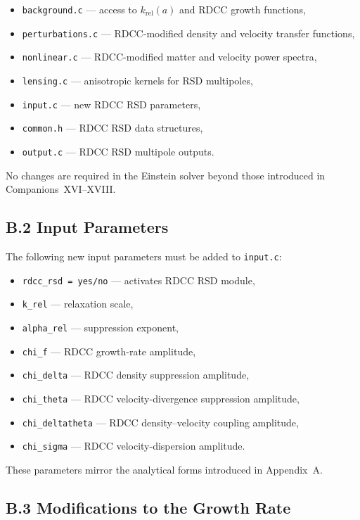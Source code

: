 \documentclass[11pt,a4paper]{article}
\begin{document}
\begin{itemize}
\item \texttt{background.c} — access to $k_{\mathrm{rel}}(a)$ and RDCC growth functions,
\item \texttt{perturbations.c} — RDCC-modified density and velocity transfer functions,
\item \texttt{nonlinear.c} — RDCC-modified matter and velocity power spectra,
\item \texttt{lensing.c} — anisotropic kernels for RSD multipoles,
\item \texttt{input.c} — new RDCC RSD parameters,
\item \texttt{common.h} — RDCC RSD data structures,
\item \texttt{output.c} — RDCC RSD multipole outputs.
\end{itemize}

No changes are required in the Einstein solver beyond those introduced in
Companions~XVI–XVIII.

\subsection*{B.2 Input Parameters}

The following new input parameters must be added to \texttt{input.c}:

\begin{itemize}
\item \texttt{rdcc\_rsd = yes/no} — activates RDCC RSD module,
\item \texttt{k\_rel} — relaxation scale,
\item \texttt{alpha\_rel} — suppression exponent,
\item \texttt{chi\_f} — RDCC growth-rate amplitude,
\item \texttt{chi\_delta} — RDCC density suppression amplitude,
\item \texttt{chi\_theta} — RDCC velocity-divergence suppression amplitude,
\item \texttt{chi\_deltatheta} — RDCC density–velocity coupling amplitude,
\item \texttt{chi\_sigma} — RDCC velocity-dispersion amplitude.
\end{itemize}

These parameters mirror the analytical forms introduced in Appendix~A.

\subsection*{B.3 Modifications to the Growth Rate}
\end{document}
